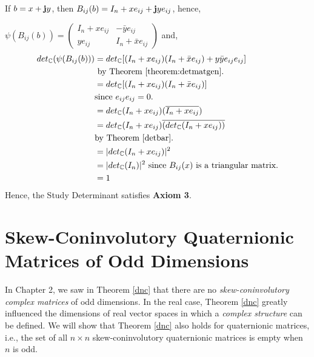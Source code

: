 		If $b = x + \textbf{j} y$, then $B_{ij}(b) = I_n + xe_{ij} + \textbf{j} ye_{ij}$, hence,

		$\psi(B_{ij}(b)) = 
		\begin{pmatrix}
			I_n + xe_{ij} & -\bar{y}e_{ij} \\
			ye_{ij} & I_n+\bar{x}e_{ij}
		\end{pmatrix}$ and,
		\begin{align*}
			det_{\operatorname{\mathbb{C}}}(\psi(B_{ij}(b))) &= det_{\operatorname{\mathbb{C}}}[(I_n+xe_{ij})(I_n+\bar{x}e_{ij})+y\bar{y}e_{ij}e_{ij}] \\ &\text{ by Theorem \ref{theorem:detmatgen}.} \\
			&=det_{\operatorname{\mathbb{C}}}[(I_n+xe_{ij})(I_n+\bar{x}e_{ij})] \\
			&\text{since $e_{ij}e_{ij} = 0$.} \\
			&=det_{\operatorname{\mathbb{C}}}(I_n+xe_{ij})(\overline{I_n+xe_{ij}}) \\
			&=det_{\operatorname{\mathbb{C}}}(I_n+xe_{ij})\overline{(det_{\operatorname{\mathbb{C}}}(I_n+xe_{ij}))} \\
			&\text{by Theorem \ref{detbar}.} \\
			&=|det_{\operatorname{\mathbb{C}}}(I_n+xe_{ij})|^2 \\
			&=|det_{\operatorname{\mathbb{C}}}(I_n)|^2 \text{ since $B_{ij}(x)$ is a triangular matrix.} \\
			&= 1
		\end{align*}
		Hence, the Study Determinant satisfies \textbf{Axiom 3}.


\iffalse
\section{Skew-Coninvolutory Quaternionic Matrices of Odd Dimensions}
In Chapter 2, we saw in Theorem \ref{dnc} that there are no \emph{skew-coninvolutory complex matrices} of odd dimensions. In the real case, Theorem \ref{dnc} greatly influenced the dimensions of real vector spaces in which a \emph{complex structure} can be defined. We will show that Theorem \ref{dnc} also holds for quaternionic matrices, i.e., the set of all $n \times n$ skew-coninvolutory quaternionic matrices is empty when $n$ is odd.

